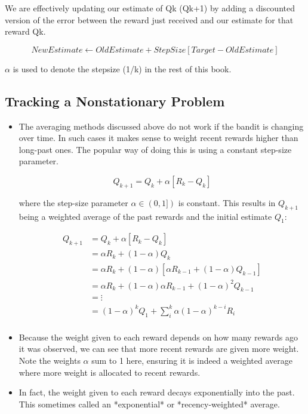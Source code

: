 We are effectively updating our estimate of Qk (Qk+1) by adding a discounted version of the error between the reward just received and our estimate for that reward Qk.

\begin{equation}
NewEstimate \leftarrow OldEstimate + StepSize \left[Target - OldEstimate \right]
\end{equation}

\(\alpha\) is used to denote the stepsize (1/k) in the rest of this book.

\subsection{Tracking a Nonstationary Problem}
\begin{itemize}
\item The averaging methods discussed above do not work if the bandit is changing over time. In such cases it makes sense to weight recent rewards higher than long-past ones. The popular way of doing this is using a constant step-size parameter.

\begin{equation}
	Q_{k+1} = Q_k +\alpha \left[R_k - Q_k\right]
\end{equation}

where the step-size parameter \(\alpha \in (0,1])\) is constant. This results in \(Q_{k+1}\) being a weighted average of the past rewards and the initial estimate \(Q_1\):

\begin{align}
Q_{k+1} &= Q_k +\alpha \left[R_k - Q_k\right] \nonumber \\
&= \alpha R_k + (1 - \alpha)Q_k \nonumber \\
&= \alpha R_k + (1 - \alpha)[\alpha R_{k-1} + (1 - \alpha)Q_{k-1}] \nonumber \\
&= \alpha R_k + (1 - \alpha)\alpha R_{k-1} + (1 - \alpha)^2 Q_{k-1}  \nonumber \\
&= \vdots \nonumber \\
&= (1-\alpha)^k Q_1 + \sum_{i}^{k} \alpha (1 - \alpha)^{k-i} R_i \\
\end{align}

\item Because the weight given to each reward depends on how many rewards ago it was observed, we can see that more recent rewards are given more weight. Note the weights \(\alpha\) sum to 1 here, ensuring it is indeed a weighted average where more weight is allocated to recent rewards.
\item In fact, the weight given to each reward decays exponentially into the past. This sometimes called an *exponential* or *recency-weighted* average.
\end{itemize}

